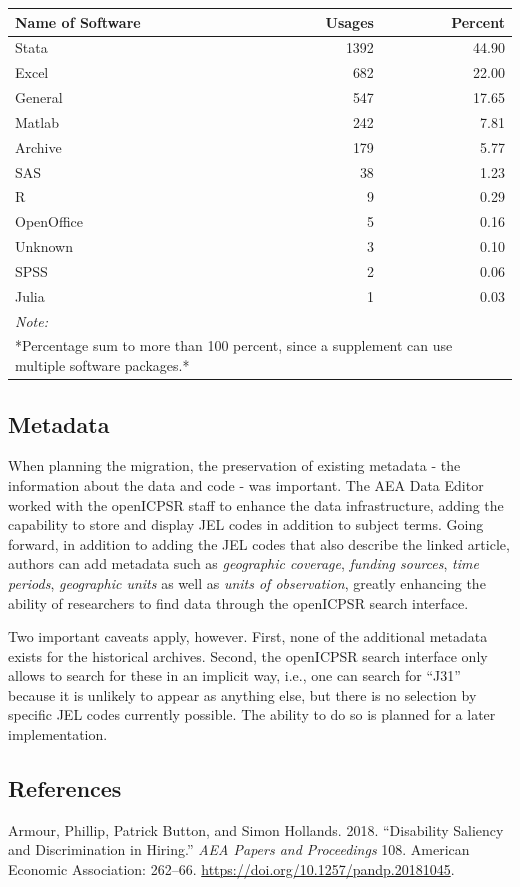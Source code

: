 \documentclass[]{article}
\begin{document}
\begin{table}[H]
\centering
\begin{tabular}{l|r|r}
\hline
Name of Software & Usages & Percent\\
\hline
Stata & 1392 & 44.90\\
\hline
Excel & 682 & 22.00\\
\hline
General & 547 & 17.65\\
\hline
Matlab & 242 & 7.81\\
\hline
Archive & 179 & 5.77\\
\hline
SAS & 38 & 1.23\\
\hline
R & 9 & 0.29\\
\hline
OpenOffice & 5 & 0.16\\
\hline
Unknown & 3 & 0.10\\
\hline
SPSS & 2 & 0.06\\
\hline
Julia & 1 & 0.03\\
\hline
\multicolumn{3}{l}{\textit{Note: }}\\
\multicolumn{3}{l}{*Percentage sum to more than 100 percent, since a supplement can use multiple software packages.*}\\
\end{tabular}
\end{table}

\hypertarget{metadata}{%
\subsection{Metadata}\label{metadata}}

When planning the migration, the preservation of existing metadata - the
information about the data and code - was important. The AEA Data Editor
worked with the openICPSR staff to enhance the data infrastructure,
adding the capability to store and display JEL codes in addition to
subject terms. Going forward, in addition to adding the JEL codes that
also describe the linked article, authors can add metadata such as
\emph{geographic coverage}, \emph{funding sources}, \emph{time periods},
\emph{geographic units} as well as \emph{units of observation}, greatly
enhancing the ability of researchers to find data through the openICPSR
search interface.

Two important caveats apply, however. First, none of the additional
metadata exists for the historical archives. Second, the openICPSR
search interface only allows to search for these in an implicit way,
i.e., one can search for ``J31'' because it is unlikely to appear as
anything else, but there is no selection by specific JEL codes currently
possible. The ability to do so is planned for a later implementation.

\hypertarget{references}{%
\subsection*{References}\label{references}}

\hypertarget{refs}{}
\leavevmode\hypertarget{ref-Armour_2018}{}%
Armour, Phillip, Patrick Button, and Simon Hollands. 2018. ``Disability
Saliency and Discrimination in Hiring.'' \emph{AEA Papers and
Proceedings} 108. American Economic Association: 262--66.
\url{https://doi.org/10.1257/pandp.20181045}.
\end{document}

